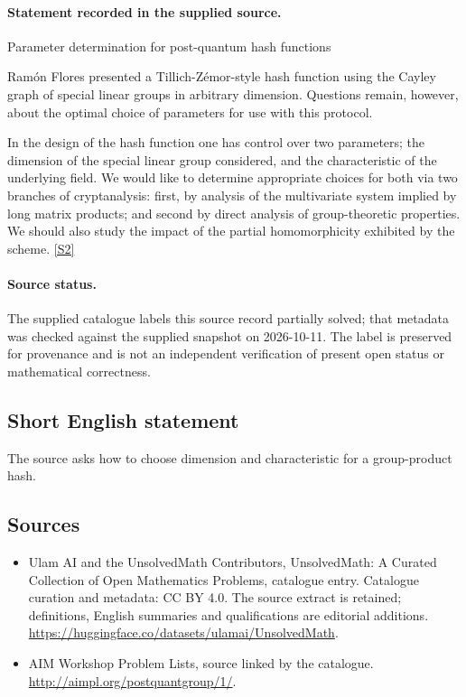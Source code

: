 \documentclass[11pt]{article}
\begin{document}
\paragraph{Statement recorded in the supplied source.}
Parameter determination for post-quantum hash functions

Ramón Flores presented a Tillich-Zémor-style hash function using the Cayley graph of special linear groups in arbitrary dimension. Questions remain, however, about the optimal choice of parameters for use with this protocol.

In the design of the hash function one has control over two parameters; the dimension of the special linear group considered, and the characteristic of the underlying field. We would like to determine appropriate choices for both via two branches of cryptanalysis: first, by analysis of the multivariate system implied by long matrix products; and second by direct analysis of group-theoretic properties. We should also study the impact of the partial homomorphicity exhibited by the scheme. \href{http://aimpl.org/postquantgroup/1/}{[S2]}
\paragraph{Source status.}
The supplied catalogue labels this source record partially solved; that metadata was checked against the supplied snapshot on 2026-10-11. The label is preserved for provenance and is not an independent verification of present open status or mathematical correctness.
\subsection{Short English statement}
The source asks how to choose dimension and characteristic for a group-product hash.
\subsection{Sources}
\begin{itemize}
\item[S1] Ulam AI and the UnsolvedMath Contributors, UnsolvedMath: A Curated Collection of Open Mathematics Problems, catalogue entry. Catalogue curation and metadata: CC BY 4.0. The source extract is retained; definitions, English summaries and qualifications are editorial additions.
\url{https://huggingface.co/datasets/ulamai/UnsolvedMath}.
\item[S2] AIM Workshop Problem Lists, source linked by the catalogue.
\url{http://aimpl.org/postquantgroup/1/}.
\end{itemize}
\end{document}
